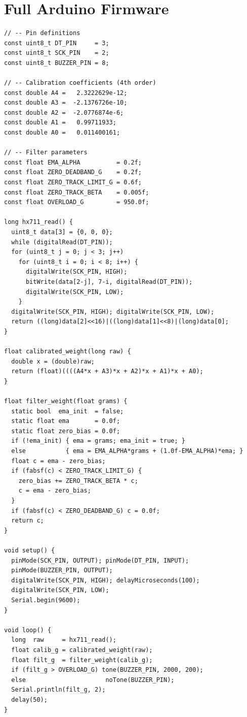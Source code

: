 \documentclass[12pt,a4paper]{article}
\begin{document}
\appendix
\section{Full Arduino Firmware}
\label{app:firmware}

\begin{lstlisting}[style=cppstyle, caption={Complete Arduino firmware.}]
// -- Pin definitions
const uint8_t DT_PIN     = 3;
const uint8_t SCK_PIN    = 2;
const uint8_t BUZZER_PIN = 8;

// -- Calibration coefficients (4th order)
const double A4 =   2.3222629e-12;
const double A3 =  -2.1376726e-10;
const double A2 =  -2.0776874e-6;
const double A1 =   0.99711933;
const double A0 =   0.011400161;

// -- Filter parameters
const float EMA_ALPHA          = 0.2f;
const float ZERO_DEADBAND_G    = 0.2f;
const float ZERO_TRACK_LIMIT_G = 0.6f;
const float ZERO_TRACK_BETA    = 0.005f;
const float OVERLOAD_G         = 950.0f;

long hx711_read() {
  uint8_t data[3] = {0, 0, 0};
  while (digitalRead(DT_PIN));
  for (uint8_t j = 0; j < 3; j++)
    for (uint8_t i = 0; i < 8; i++) {
      digitalWrite(SCK_PIN, HIGH);
      bitWrite(data[2-j], 7-i, digitalRead(DT_PIN));
      digitalWrite(SCK_PIN, LOW);
    }
  digitalWrite(SCK_PIN, HIGH); digitalWrite(SCK_PIN, LOW);
  return ((long)data[2]<<16)|((long)data[1]<<8)|(long)data[0];
}

float calibrated_weight(long raw) {
  double x = (double)raw;
  return (float)((((A4*x + A3)*x + A2)*x + A1)*x + A0);
}

float filter_weight(float grams) {
  static bool  ema_init  = false;
  static float ema       = 0.0f;
  static float zero_bias = 0.0f;
  if (!ema_init) { ema = grams; ema_init = true; }
  else           { ema = EMA_ALPHA*grams + (1.0f-EMA_ALPHA)*ema; }
  float c = ema - zero_bias;
  if (fabsf(c) < ZERO_TRACK_LIMIT_G) {
    zero_bias += ZERO_TRACK_BETA * c;
    c = ema - zero_bias;
  }
  if (fabsf(c) < ZERO_DEADBAND_G) c = 0.0f;
  return c;
}

void setup() {
  pinMode(SCK_PIN, OUTPUT); pinMode(DT_PIN, INPUT);
  pinMode(BUZZER_PIN, OUTPUT);
  digitalWrite(SCK_PIN, HIGH); delayMicroseconds(100);
  digitalWrite(SCK_PIN, LOW);
  Serial.begin(9600);
}

void loop() {
  long  raw     = hx711_read();
  float calib_g = calibrated_weight(raw);
  float filt_g  = filter_weight(calib_g);
  if (filt_g > OVERLOAD_G) tone(BUZZER_PIN, 2000, 200);
  else                      noTone(BUZZER_PIN);
  Serial.println(filt_g, 2);
  delay(50);
}
\end{lstlisting}
\end{document}
